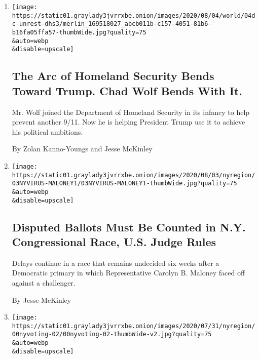 \begin{enumerate}
\def\labelenumi{\arabic{enumi}.}
\item
  \href{/2020/08/04/us/politics/trump-homeland-security.html}{}

  \texttt{[image: https://static01.graylady3jvrrxbe.onion/images/2020/08/04/world/04dc-unrest-dhs3/merlin\_169518027\_abcb011b-c157-4051-81b6-b16fa05ffa57-thumbWide.jpg?quality=75\\\&auto=webp\\\&disable=upscale]}

  \hypertarget{the-arc-of-homeland-security-bends-toward-trump-chad-wolf-bends-with-it}{%
  \subsection{The Arc of Homeland Security Bends Toward Trump. Chad Wolf
  Bends With
  It.}\label{the-arc-of-homeland-security-bends-toward-trump-chad-wolf-bends-with-it}}

  Mr. Wolf joined the Department of Homeland Security in its infancy to
  help prevent another 9/11. Now he is helping President Trump use it to
  achieve his political ambitions.

  By Zolan Kanno-Youngs and Jesse McKinley
\item
  \href{/2020/08/03/nyregion/nyc-congress-carolyn-mahoney-ballots.html}{}

  \texttt{[image: https://static01.graylady3jvrrxbe.onion/images/2020/08/03/nyregion/03NYVIRUS-MALONEY1/03NYVIRUS-MALONEY1-thumbWide.jpg?quality=75\\\&auto=webp\\\&disable=upscale]}

  \hypertarget{disputed-ballots-must-be-counted-in-ny-congressional-race-us-judge-rules}{%
  \subsection{Disputed Ballots Must Be Counted in N.Y. Congressional
  Race, U.S. Judge
  Rules}\label{disputed-ballots-must-be-counted-in-ny-congressional-race-us-judge-rules}}

  Delays continue in a race that remains undecided six weeks after a
  Democratic primary in which Representative Carolyn B. Maloney faced
  off against a challenger.

  By Jesse McKinley
\item
  \href{/2020/08/03/nyregion/nyc-mail-ballots-voting.html}{}

  \texttt{[image: https://static01.graylady3jvrrxbe.onion/images/2020/07/31/nyregion/00nyvoting-02/00nyvoting-02-thumbWide-v2.jpg?quality=75\\\&auto=webp\\\&disable=upscale]}


\end{enumerate}
